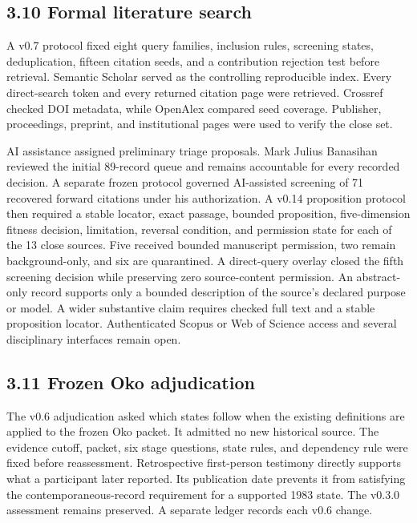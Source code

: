 \documentclass[11pt]{article}
\begin{document}
\subsection*{3.10 Formal literature search}

A v0.7 protocol fixed eight query families, inclusion rules, screening states, deduplication, fifteen citation seeds, and a contribution rejection test before retrieval. Semantic Scholar served as the controlling reproducible index. Every direct-search token and every returned citation page were retrieved. Crossref checked DOI metadata, while OpenAlex compared seed coverage. Publisher, proceedings, preprint, and institutional pages were used to verify the close set.

AI assistance assigned preliminary triage proposals. Mark Julius Banasihan reviewed the initial 89-record queue and remains accountable for every recorded decision. A separate frozen protocol governed AI-assisted screening of 71 recovered forward citations under his authorization. A v0.14 proposition protocol then required a stable locator, exact passage, bounded proposition, five-dimension fitness decision, limitation, reversal condition, and permission state for each of the 13 close sources. Five received bounded manuscript permission, two remain background-only, and six are quarantined. A direct-query overlay closed the fifth screening decision while preserving zero source-content permission. An abstract-only record supports only a bounded description of the source's declared purpose or model. A wider substantive claim requires checked full text and a stable proposition locator. Authenticated Scopus or Web of Science access and several disciplinary interfaces remain open.

\subsection*{3.11 Frozen Oko adjudication}

The v0.6 adjudication asked which states follow when the existing definitions are applied to the frozen Oko packet. It admitted no new historical source. The evidence cutoff, packet, six stage questions, state rules, and dependency rule were fixed before reassessment. Retrospective first-person testimony directly supports what a participant later reported. Its publication date prevents it from satisfying the contemporaneous-record requirement for a supported 1983 state. The v0.3.0 assessment remains preserved. A separate ledger records each v0.6 change.
\end{document}
